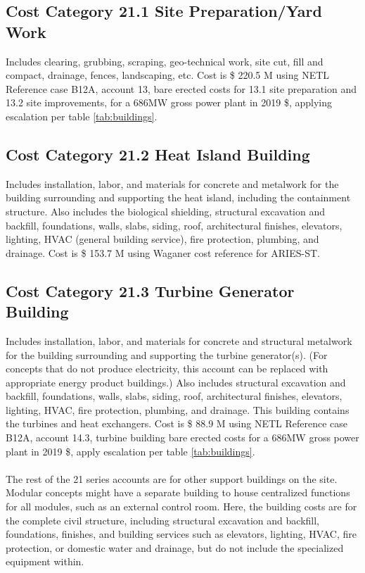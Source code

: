 










\subsection*{Cost Category 21.1 Site Preparation/Yard Work}
Includes clearing, grubbing, scraping, geo-technical work, site cut, fill and compact, drainage, fences, landscaping, etc.  Cost is \$ 220.5 M using NETL Reference case B12A, account 13, bare erected costs for 13.1 site preparation and 13.2 site improvements, for a 686MW gross power plant in 2019 \$, applying escalation per table \ref{tab:buildings}.

\subsection*{Cost Category 21.2 Heat Island Building}
Includes installation, labor, and materials for concrete and metalwork for the building surrounding and supporting the heat island, including the containment structure. Also includes the biological shielding, structural excavation and backfill, foundations, walls, slabs, siding, roof, architectural finishes, elevators, lighting, HVAC (general building service), fire protection, plumbing, and drainage. Cost is \$ 153.7 M using Waganer cost reference for ARIES-ST.


\subsection*{Cost Category 21.3 Turbine Generator Building}
Includes installation, labor, and materials for concrete and structural metalwork for the building surrounding and supporting the turbine generator(s). (For concepts that do not produce electricity, this account can be replaced with appropriate energy product buildings.) Also includes structural excavation and backfill, foundations, walls, slabs, siding, roof, architectural finishes, elevators, lighting, HVAC, fire protection, plumbing, and drainage.  This building contains the turbines and heat exchangers. Cost is \$ 88.9 M using NETL Reference case B12A, account 14.3, turbine building bare erected costs for a 686MW gross power plant in 2019 \$, apply escalation per table \ref{tab:buildings}.

\paragraph{}
The rest of the 21 series accounts are for other support buildings on the site. Modular concepts might have a separate building to house centralized functions for all modules, such as an external control room. Here, the building costs are for the complete civil structure, including structural excavation and backfill, foundations, finishes, and building services such as elevators, lighting, HVAC, fire protection, or domestic water and drainage, but do not include the specialized equipment within.

